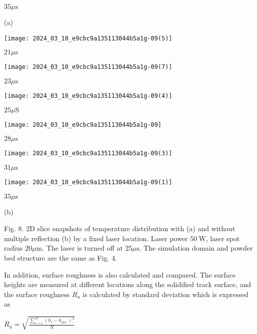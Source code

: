 \documentclass[10pt]{article}
\begin{document}
$35 \mu \mathrm{s}$

(a)

\begin{center}
\texttt{[image: 2024\_03\_10\_e9cbc9a135113044b5a1g-09(5)]}
\end{center}

$21 \mu \mathrm{s}$

\begin{center}
\texttt{[image: 2024\_03\_10\_e9cbc9a135113044b5a1g-09(7)]}
\end{center}

$23 \mu \mathrm{s}$

\begin{center}
\texttt{[image: 2024\_03\_10\_e9cbc9a135113044b5a1g-09(4)]}
\end{center}

$25 \mu \mathrm{S}$

\begin{center}
\texttt{[image: 2024\_03\_10\_e9cbc9a135113044b5a1g-09]}
\end{center}

$28 \mu \mathrm{s}$

\begin{center}
\texttt{[image: 2024\_03\_10\_e9cbc9a135113044b5a1g-09(3)]}
\end{center}

$31 \mu \mathrm{s}$

\begin{center}
\texttt{[image: 2024\_03\_10\_e9cbc9a135113044b5a1g-09(1)]}
\end{center}

$35 \mu \mathrm{s}$

(b)

Fig. 8. 2D slice snapshots of temperature distribution with (a) and without multiple reflection (b) by a fixed laser location. Laser power $50 \mathrm{~W}$, laser spot radius $20 \mu \mathrm{m}$. The laser is turned off at $25 \mu \mathrm{s}$. The simulation domain and powder bed structure are the same as Fig. 4.

In addition, surface roughness is also calculated and compared. The surface heights are measured at different locations along the solidified track surface, and the surface roughness $R_{a}$ is calculated by standard deviation which is expressed as

$R_{a}=\sqrt{\frac{\sum_{i=1}^{N}\left(h_{i}-h_{\text {ave }}\right)^{2}}{N}}$
\end{document}
